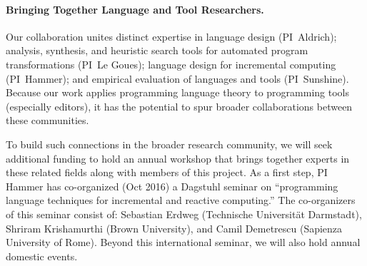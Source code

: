\paragraph{Bringing Together Language and Tool Researchers.}
Our collaboration unites distinct expertise in
language design (PI~Aldrich); analysis, synthesis, and heuristic search tools for automated program transformations (PI~Le Goues); language design for incremental computing (PI~Hammer); and empirical evaluation of languages and tools (PI~Sunshine).  Because our work applies programming language theory to programming tools (especially editors), it has the potential to spur broader collaborations between these communities.
%

To build such connections in the broader research community, we
will seek additional funding to hold an annual workshop that
brings together experts in these related fields along
with members of this project.
%
As a first step, PI Hammer has co-organized (Oct 2016) a Dagstuhl
seminar on ``programming language techniques for incremental and
reactive computing.''
%
The co-organizers of this seminar consist of:
  Sebastian Erdweg (Technische Universit\"at Darmstadt),  
  Shriram Krishamurthi (Brown University),
  and Camil Demetrescu (Sapienza University of Rome).
%
Beyond this international seminar, we will also hold annual domestic events.

